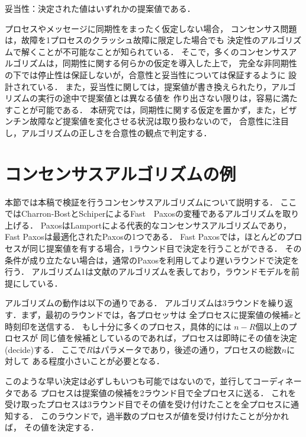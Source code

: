 \documentclass[technicalreport]{ieicej}
\theoremstyle{plain}
\begin{document}
妥当性：決定された値はいずれかの提案値である．

プロセスやメッセージに同期性をまったく仮定しない場合，
コンセンサス問題は，故障を1プロセスのクラッシュ故障に限定した場合でも
決定性のアルゴリズムで解くことが不可能なことが知られている．
そこで，多くのコンセンサスアルゴリズムは，同期性に関する何らかの仮定を導入した上で，
完全な非同期性の下では停止性は保証しないが，合意性と妥当性については保証するように
設計されている．
また，妥当性に関しては，提案値が書き換えられたり，アルゴリズムの実行の途中で提案値とは異なる値を
作り出さない限りは，容易に満たすことが可能である．
本研究では，同期性に関する仮定を置かず，また，ビザンチン故障など提案値を変化させる状況は取り扱わないので，
合意性に注目し，アルゴリズムの正しさを合意性の観点で判定する．


\section{コンセンサスアルゴリズムの例}

本節では本稿で検証を行うコンセンサスアルゴリズムについて説明する．
ここではCharron-BostとSchiperによるFast　Paxosの変種であるアルゴリズムを取り上げる\cite{DBLP:conf/prdc/Charron-BostS06}．
PaxosはLamportによる代表的なコンセンサスアルゴリズムであり\cite{Parliament}，
Fast Paxosは最適化されたPaxosの1つである\cite{FastPaxos}．
Fast Paxosでは，ほとんどのプロセスが同じ提案値を有する場合，1ラウンド目で決定を行うことができる．
その条件が成り立たない場合は，通常のPaxosを利用してより遅いラウンドで決定を行う．
アルゴリズム1は文献のアルゴリズムを表しており，ラウンドモデルを前提にしている．

アルゴリズムの動作は以下の通りである．
アルゴリズムは3ラウンドを繰り返す．まず，最初のラウンドでは，各プロセッサは
全プロセスに提案値の候補$x$と時刻印を送信する．
もし十分に多くのプロセス，具体的には $n - R$個以上のプロセスが
同じ値を候補としているのであれば，プロセスは即時にその値を決定(decide)する．
ここで$R$はパラメータであり，後述の通り，プロセスの総数$n$に対して
ある程度小さいことが必要となる．

このような早い決定は必ずしもいつも可能ではないので，並行してコーディネータである
プロセスは提案値の候補を2ラウンド目で全プロセスに送る．
これを受け取ったプロセスは3ラウンド目でその値を受け付けたことを全プロセスに通知する．
このラウンドで，過半数のプロセスが値を受け付けたことが分かれば，
その値を決定する．


\end{document}
